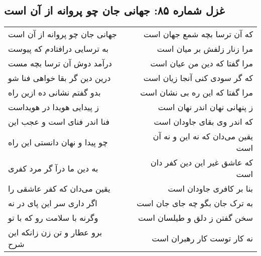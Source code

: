 \begin{center}
\section*{غزل شماره ۸۵: جهانی جان چو پروانه از آن است}
\label{sec:085}
\begin{longtable}{l p{0.5cm} r}
جهانی جان چو پروانه از آن است
&&
که آن ترسا بچه شمع جهان است
\\
به ترسایی درافتادم که پیوست
&&
مرا زنار زلفش بر میان است
\\
درآمد دوش آن ترسا بچه مست
&&
مرا گفتا که دین من عیان است
\\
درین دین گر بقا خواهی فنا شو
&&
که گر سودی کنی آنجا زیان است
\\
بدو گفتم نشانی ده ازین راه
&&
مرا گفتا که این ره بی نشان است
\\
ز پیدایی هویدا در هویداست
&&
ز پنهانی نهان اندر نهان است
\\
فنا اندر فنای است و عجب این
&&
که اندر وی بقای جاودان است
\\
چو پیدا و نهان دانستی این راه
&&
یقین می‌دان که نه این و نه آن است
\\
به دین ما درآ گر مرد کفری
&&
که عاشق غیر این دین کفر دان است
\\
یقین می‌دان که کفر عاشقی را
&&
بنا بر کافری جاودان است
\\
اگر داری سر این پای در نه
&&
به ترک جان بگو چه جای جان است
\\
وگرنه با سلامت رو که با تو
&&
سخن گفتن ز دلق و طیلسان است
\\
برو عطار و تن زن زانکه این شرح
&&
نه کار توست کار رهبران است
\\
\end{longtable}
\end{center}
